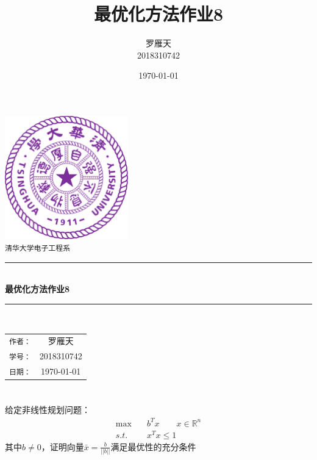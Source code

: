 \documentclass[a4paper]{article}
\title{最优化方法作业8}
\author{罗雁天 \\
2018310742}
\date{\today}
\begin{document}
\newcommand{\HRule}{\rule{\linewidth}{0.5mm}}
\begin{titlepage}
	\begin{center}
		\includegraphics[width=0.4\textwidth]{Tsinghua2.png}\\[1cm]
		\textsc{\Large \texttt{清华大学电子工程系}}\\[1cm]
		\HRule \\[1cm]
		{\Huge \bfseries 最优化方法作业8}\\[0.4cm]
		\HRule \\[3.5cm]
		\begin{minipage}{0.4\textwidth}
			\begin{center}
				\Large
				\begin{tabular}{cc}
					\texttt{作者：} & 罗雁天 \\[0.5cm]
					\texttt{学号：} & 2018310742 \\[0.5cm]
					\texttt{日期：} & \today
				\end{tabular}
			\end{center}
		\end{minipage}
		\vfill
	\end{center}
\end{titlepage}

\section{}
给定非线性规划问题：
\begin{equation}
\begin{aligned}
\max \quad &b^Tx \qquad x\in \mathbb{R}^n \\
s.t.\quad &x^Tx\le 1
\end{aligned}
\end{equation}
其中$b\ne 0$，证明向量$\bar{x}=\frac{b}{||b||}$满足最优性的充分条件
\end{document}
